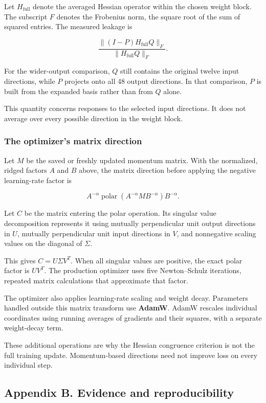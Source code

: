 \documentclass[
  14pt,
  letterpaper,
]{extarticle}
\begin{document}
Let \(H_{\mathrm{full}}\) denote the averaged Hessian operator within
the chosen weight block. The subscript \(F\) denotes the Frobenius norm,
the square root of the sum of squared entries. The measured leakage is

\[\frac{\|(I-P)H_{\mathrm{full}}Q\|_F}{\|H_{\mathrm{full}}Q\|_F}.\]

For the wider-output comparison, \(Q\) still contains the original
twelve input directions, while \(P\) projects onto all 48 output
directions. In that comparison, \(P\) is built from the expanded basis
rather than from \(Q\) alone.

This quantity concerns responses to the selected input directions. It
does not average over every possible direction in the weight block.

\subsubsection{The optimizer's matrix
direction}\label{the-optimizers-matrix-direction}

Let \(M\) be the saved or freshly updated momentum matrix. With the
normalized, ridged factors \(A\) and \(B\) above, the matrix direction
before applying the negative learning-rate factor is

\[A^{-\alpha}\operatorname{polar}\!\left(A^{-\alpha}MB^{-\alpha}\right)B^{-\alpha}.\]

Let \(C\) be the matrix entering the polar operation. Its singular value
decomposition represents it using mutually perpendicular unit output
directions in \(U\), mutually perpendicular unit input directions in
\(V\), and nonnegative scaling values on the diagonal of \(\Sigma\).

This gives \(C=U\Sigma V^T\). When all singular values are positive, the
exact polar factor is \(UV^T\). The production optimizer uses five
Newton--Schulz iterations, repeated matrix calculations that approximate
that factor.

The optimizer also applies learning-rate scaling and weight decay.
Parameters handled outside this matrix transform use \textbf{AdamW}.
AdamW rescales individual coordinates using running averages of
gradients and their squares, with a separate weight-decay term.

These additional operations are why the Hessian congruence criterion is
not the full training update. Momentum-based directions need not improve
loss on every individual step.

\subsection{Appendix B. Evidence and
reproducibility}\label{appendix-b.-evidence-and-reproducibility}
\end{document}
